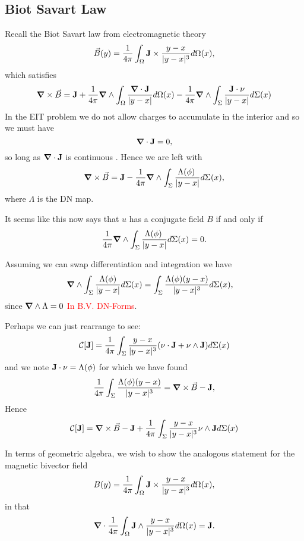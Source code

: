 \subsection{Biot Savart Law}

Recall the Biot Savart law from electromagnetic theory
\[
\vec{B}(y)=\frac{1}{4\pi} \int_\Omega \mathbf{J} \times \frac{y-x}{|y-x|^3} d\Omega(x),
\]
which satisfies 
\[
\boldsymbol{\nabla} \times \vec{B} = \mathbf{J} + \frac{1}{4\pi} \boldsymbol{\nabla} \wedge \int_\Omega \frac{\boldsymbol{\nabla} \cdot \mathbf{J}}{|y-x|}d\Omega(x) -\frac{1}{4\pi} \boldsymbol{\nabla} \wedge \int_\Sigma \frac{\mathbf{J} \cdot \nu}{|y-x|}d\Sigma(x)
\]
In the EIT problem we do not allow charges to accumulate in the interior and so we must have
\[
\boldsymbol{\nabla} \cdot \mathbf{J} = 0,
\]
so long as $\boldsymbol{\nabla} \cdot \mathbf{J}$ is continuous \cite{feldman_calderproblem_nodate}. Hence we are left with
\[
\boldsymbol{\nabla} \times \vec{B} = \mathbf{J} -\frac{1}{4\pi} \boldsymbol{\nabla} \wedge \int_\Sigma \frac{\Lambda(\phi)\\}{|y-x|}d\Sigma(x),
\]
where $\Lambda$ is the DN map.

\begin{remark}
    It seems like this now says that $u$ has a conjugate field $B$ if and only if
\[
\frac{1}{4\pi} \boldsymbol{\nabla} \wedge \int_\Sigma \frac{\Lambda(\phi)\\}{|y-x|}d\Sigma(x) = 0.
\]
\end{remark}
Assuming we can swap differentiation and integration we have
\begin{align*}
\boldsymbol{\nabla} \wedge \int_\Sigma \frac{\Lambda(\phi)}{|y-x|} d\Sigma(x) &= \int_\Sigma \frac{\Lambda(\phi)(y-x)}{|y-x|^3}d\Sigma(x),
\end{align*}
since $\boldsymbol{\nabla} \wedge \Lambda = 0$ \textcolor{red}{In B.V. DN-Forms}.

\begin{remark}
Perhaps we can just rearrange to see:
\[
\mathcal{C} [\mathbf{J}] = \frac{1}{4\pi} \int_\Sigma \frac{y-x}{|y-x|^3} (\nu \cdot \mathbf{J} + \nu \wedge \mathbf{J}) d\Sigma(x) 
\]
and we note $\mathbf{J} \cdot \nu = \Lambda(\phi)$ for which we have found
\[
 \frac{1}{4\pi} \int_\Sigma \frac{\Lambda(\phi)(y-x)}{|y-x|^3}=\boldsymbol{\nabla} \times \vec{B}-\mathbf{J},
\]
Hence 
\[
\mathcal{C}[\mathbf{J}] = \boldsymbol{\nabla} \times \vec{B} - \mathbf{J} + \frac{1}{4\pi} \int_\Sigma \frac{y-x}{|y-x|^3} \nu \wedge \mathbf{J} d \Sigma(x)
\]
\end{remark}

In terms of geometric algebra, we wish to show the analogous statement for the magnetic bivector field
\[
B(y) = \frac{1}{4\pi} \int_\Omega \mathbf{J} \times \frac{y-x}{|y-x|^3} d\Omega(x),
\] 
in that
\[
\boldsymbol{\nabla} \cdot \frac{1}{4\pi} \int_\Omega \mathbf{J} \wedge \frac{y-x}{|y-x|^3} d\Omega(x) = \mathbf{J}.
\]



